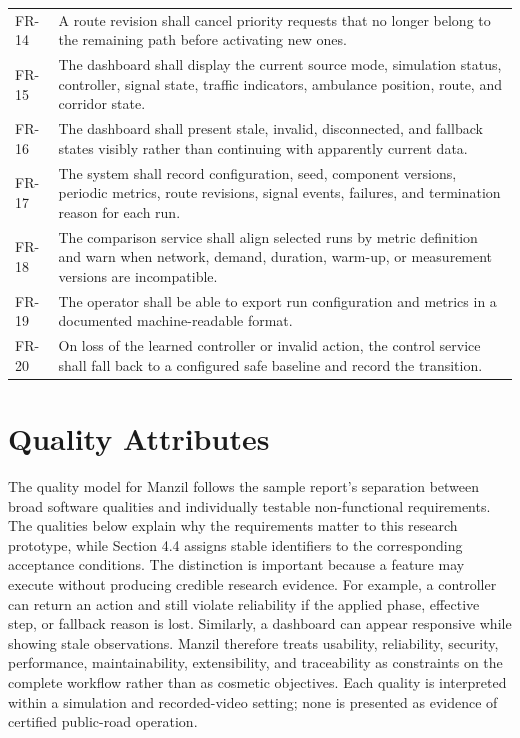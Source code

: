 \begin{longtable}{p{}p{}}
FR-14 & A route revision shall cancel priority requests that no longer belong to the remaining path before activating new ones.\\
FR-15 & The dashboard shall display the current source mode, simulation status, controller, signal state, traffic indicators, ambulance position, route, and corridor state.\\
FR-16 & The dashboard shall present stale, invalid, disconnected, and fallback states visibly rather than continuing with apparently current data.\\
FR-17 & The system shall record configuration, seed, component versions, periodic metrics, route revisions, signal events, failures, and termination reason for each run.\\
FR-18 & The comparison service shall align selected runs by metric definition and warn when network, demand, duration, warm-up, or measurement versions are incompatible.\\
FR-19 & The operator shall be able to export run configuration and metrics in a documented machine-readable format.\\
FR-20 & On loss of the learned controller or invalid action, the control service shall fall back to a configured safe baseline and record the transition.\\
\bottomrule
\end{longtable}

\section{Quality Attributes}

The quality model for Manzil follows the sample report's separation between broad software qualities and individually testable non-functional requirements. The qualities below explain why the requirements matter to this research prototype, while Section 4.4 assigns stable identifiers to the corresponding acceptance conditions. The distinction is important because a feature may execute without producing credible research evidence. For example, a controller can return an action and still violate reliability if the applied phase, effective step, or fallback reason is lost. Similarly, a dashboard can appear responsive while showing stale observations. Manzil therefore treats usability, reliability, security, performance, maintainability, extensibility, and traceability as constraints on the complete workflow rather than as cosmetic objectives. Each quality is interpreted within a simulation and recorded-video setting; none is presented as evidence of certified public-road operation.

